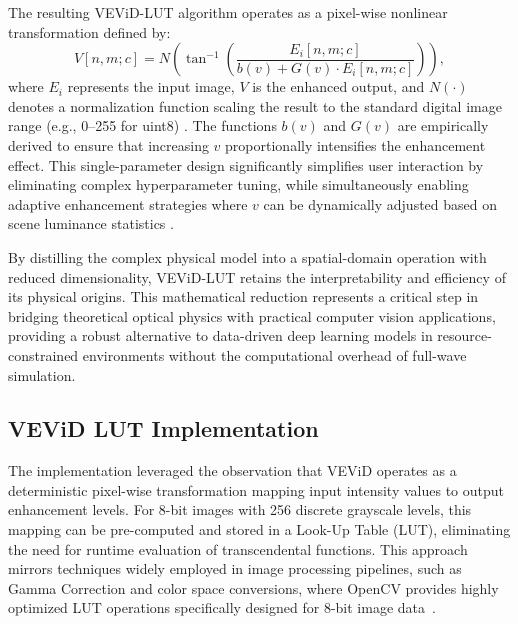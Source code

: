 \documentclass[journal,transmag]{IEEEtran}
\begin{document}
The resulting VEViD-LUT algorithm operates as a pixel-wise nonlinear transformation defined by:
\begin{equation}
    V[n, m; c] = N \left( \tan^{-1} \left( \frac{E_i[n, m; c]}{b(v) + G(v) \cdot E_i[n, m; c]} \right) \right),
\end{equation}
where $E_i$ represents the input image, $V$ is the enhanced output, and $N(\cdot)$ denotes a normalization function scaling the result to the standard digital image range (e.g., 0--255 for uint8) \cite{zhou2024simplification}. The functions $b(v)$ and $G(v)$ are empirically derived to ensure that increasing $v$ proportionally intensifies the enhancement effect. This single-parameter design significantly simplifies user interaction by eliminating complex hyperparameter tuning, while simultaneously enabling adaptive enhancement strategies where $v$ can be dynamically adjusted based on scene luminance statistics \cite{zhou2024simplification}.

By distilling the complex physical model into a spatial-domain operation with reduced dimensionality, VEViD-LUT retains the interpretability and efficiency of its physical origins. This mathematical reduction represents a critical step in bridging theoretical optical physics with practical computer vision applications, providing a robust alternative to data-driven deep learning models in resource-constrained environments without the computational overhead of full-wave simulation.

\subsection{VEViD LUT Implementation}
The implementation leveraged the observation that VEViD operates as a deterministic pixel-wise transformation mapping input intensity values to output enhancement levels. For 8-bit images with 256 discrete grayscale levels, this mapping can be pre-computed and stored in a Look-Up Table (LUT), eliminating the need for runtime evaluation of transcendental functions. This approach mirrors techniques widely employed in image processing pipelines, such as Gamma Correction and color space conversions, where OpenCV provides highly optimized LUT operations specifically designed for 8-bit image data~\cite{bradski2008opencv}.
\end{document}
